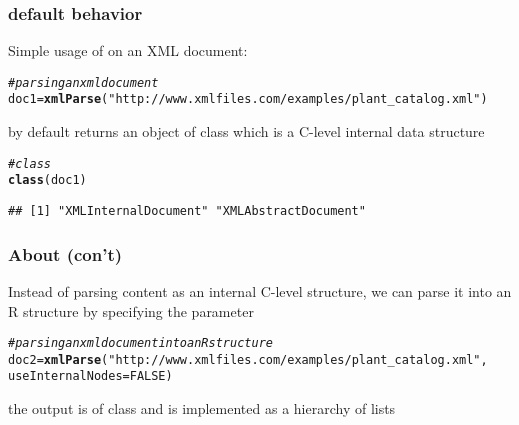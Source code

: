 \documentclass[12pt]{beamer}\usepackage[]{graphicx}\usepackage[]{color}
\makeatletter
\newcommand{\hlnum}[1]{\textcolor[rgb]{0.686,0.059,0.569}{#1}}%
\newcommand{\hlstr}[1]{\textcolor[rgb]{0.192,0.494,0.8}{#1}}%
\newcommand{\hlcom}[1]{\textcolor[rgb]{0.678,0.584,0.686}{\textit{#1}}}%
\newcommand{\hlstd}[1]{\textcolor[rgb]{0.345,0.345,0.345}{#1}}%
\newcommand{\hlkwb}[1]{\textcolor[rgb]{0.69,0.353,0.396}{#1}}%
\newcommand{\hlkwc}[1]{\textcolor[rgb]{0.333,0.667,0.333}{#1}}%
\newcommand{\hlkwd}[1]{\textcolor[rgb]{0.737,0.353,0.396}{\textbf{#1}}}%
\newenvironment{kframe}{%
 \def\at@end@of@kframe{}%
 \ifinner\ifhmode%
  \def\at@end@of@kframe{\end{minipage}}%
  \begin{minipage}{\columnwidth}%
 \fi\fi%
 \def\FrameCommand##1{\hskip\@totalleftmargin \hskip-\fboxsep
 \colorbox{shadecolor}{##1}\hskip-\fboxsep
     \hskip-\linewidth \hskip-\@totalleftmargin \hskip\columnwidth}%
 \MakeFramed {\advance\hsize-\width
   \@totalleftmargin\z@ \linewidth\hsize
   \@setminipage}}%
 {\par\unskip\endMakeFramed%
 \at@end@of@kframe}
\newenvironment{knitrout}{}{} %
\makeatother
\begin{document}

\begin{frame}[fragile]
\frametitle{ default behavior}

Simple usage of  on an XML document:
\begin{knitrout}\scriptsize
{}\color{fgcolor}\begin{kframe}
\begin{alltt}
\hlcom{# parsing an xml document}
\hlstd{doc1} \hlkwb{=} \hlkwd{xmlParse}\hlstd{(}\hlstr{"http://www.xmlfiles.com/examples/plant_catalog.xml"}\hlstd{)}
\end{alltt}
\end{kframe}
\end{knitrout}

by default  returns an object of class {\hilit {}} which is a C-level internal data structure

\begin{knitrout}\footnotesize
{}\color{fgcolor}\begin{kframe}
\begin{alltt}
\hlcom{# class }
\hlkwd{class}\hlstd{(doc1)}
\end{alltt}
\begin{verbatim}
## [1] "XMLInternalDocument" "XMLAbstractDocument"
\end{verbatim}
\end{kframe}
\end{knitrout}

\end{frame}


\begin{frame}[fragile]
\frametitle{About  (con't)}

Instead of parsing content as an internal C-level structure, we can parse it into an R structure by specifying the parameter {\hilit {}}
\eb
\begin{knitrout}\scriptsize
{}\color{fgcolor}\begin{kframe}
\begin{alltt}
\hlcom{# parsing an xml document into an R structure}
\hlstd{doc2} \hlkwb{=} \hlkwd{xmlParse}\hlstd{(}\hlstr{"http://www.xmlfiles.com/examples/plant_catalog.xml"}\hlstd{,}
                \hlkwc{useInternalNodes} \hlstd{=} \hlnum{FALSE}\hlstd{)}
\end{alltt}
\end{kframe}
\end{knitrout}

the output is of class {\hilit {}} and is implemented as a hierarchy of lists

\end{frame}
\end{document}
